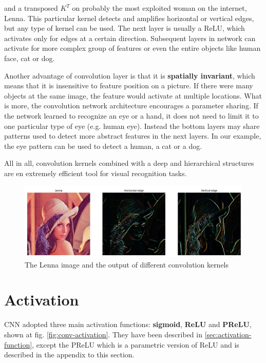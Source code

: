 and a transposed $K^T$ on probably the most exploited woman on the internet, Lenna. This particular kernel detects and amplifies horizontal or vertical edges, but any type of kernel can be used. The next layer is usually a ReLU, which activates only for edges at a certain direction. Subsequent layers in network can activate for more complex group of features or even the entire objects like human face, cat or dog. 

Another advantage of convolution layer is that it is \textbf{spatially invariant}, which means that it is insensitive to feature position on a picture. If there were many objects at the same image, the feature would activate at multiple locations. What is more, the convolution network architecture encourages a parameter sharing. If the network learned to recognize an eye or a hand, it does not need to limit it to one particular type of eye (e.g. human eye). Instead the bottom layers may share patterns used to detect more abstract features in the next layers. In our example, the eye pattern can be used to detect a human, a cat or a dog.

All in all, convolution kernels combined with a deep and hierarchical structures are en extremely efficient tool for visual recognition tasks.

\begin{figure}[h]
    \centering
    \includegraphics[width=16cm]{img/Lenna1.png}
    \caption{The Lenna image and the output of different convolution kernels}
    \label{fig:conv-lenna}
\end{figure}

\section{Activation}
\label{sec:conv-activation}

CNN adopted three main activation functions: \textbf{sigmoid}, \textbf{ReLU} and \textbf{PReLU}, shown at fig. \ref{fig:conv-activation}. They have been described in \ref{sec:activation-function}, except the PReLU which is a parametric version of ReLU and is described in the appendix to this section.

